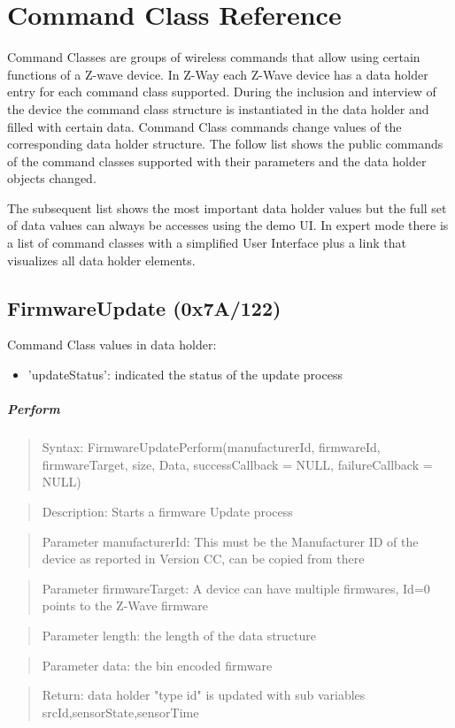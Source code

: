 \chapter{Command Class Reference}
\label{ccs}


Command Classes are groups of wireless commands that allow using certain functions of a Z-wave device.  
In Z-Way each Z-Wave device has a data holder entry for each command class supported. During the inclusion 
and interview of the device the command class structure is instantiated in the data holder and filled with 
certain data.  Command Class commands change values of the corresponding data holder structure. The follow 
list shows the public commands of the command classes supported with their parameters and the data holder 
objects changed.


The subsequent list shows the most important data holder values but the full set of data values can always 
be accesses using the demo UI. In expert mode there is a list of command classes with a simplified 
User Interface plus a link that visualizes all data holder elements.
 


\section{FirmwareUpdate (0x7A/122)}	

Command Class values in data holder:
\begin{itemize}
\item 'updateStatus': indicated the status of the update process
\end{itemize}

\paragraph {Perform}
\begin{quote} Syntax: FirmwareUpdatePerform(manufacturerId, firmwareId, firmwareTarget, size, Data, successCallback = NULL, failureCallback = NULL)\end{quote}
\begin{quote} Description: Starts a firmware Update process\end{quote}
\begin{quote} Parameter manufacturerId:  This must be the Manufacturer ID of the device as reported in Version CC, can be copied from there\end{quote}
\begin{quote} Parameter firmwareTarget:  A device can have multiple firmwares, Id=0 points to the Z-Wave firmware\end{quote}
\begin{quote} Parameter length:  the length of the data structure\end{quote}
\begin{quote} Parameter data:  the bin encoded firmware\end{quote}
\begin{quote} Return: data holder "type id" is updated with sub variables srcId,sensorState,sensorTime \end{quote}

